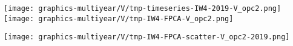 
\begin{center}
\begin{minipage}{7.0in}
\texttt{[image: graphics-multiyear/V/tmp-timeseries-IW4-2019-V\_opc2.png]}
\quad
\texttt{[image: graphics-multiyear/V/tmp-IW4-FPCA-V\_opc2.png]}
\vskip 1.0cm
\begin{center}
\texttt{[image: graphics-multiyear/V/tmp-IW4-FPCA-scatter-V\_opc2-2019.png]}
\end{center}
\end{minipage}
\end{center}


\renewcommand{\theenumi}{\roman{enumi}}
\renewcommand{\labelenumi}{\textnormal{(\theenumi)}$\;\;$}


